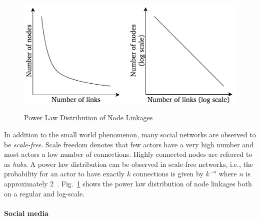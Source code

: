 \begin{figure}[h]
  \centering
  \includegraphics[height=6cm]{img/power_law_linkages}
  \caption[Power Law Distribution of Node Linkages]{Power Law Distribution of Node Linkages~\cite{Barabasi2003}}
\label{fig:power_law}
\end{figure}

In addition to the small world phenomenon, many social networks are observed to
be \textit{scale-free}.
Scale freedom denotes that few actors have a very high number and most actors 
a low number of connections.
Highly connected nodes are referred to as \textit{hubs}.
A power law distribution can be observed in scale-free networks, i.e., the
probability for an actor to have exactly $k$ connections is given by $k^{-n}$
where $n$ is approximately 2~\cite{Barabasi2003}.
Fig.~\ref{fig:power_law} shows the power law distribution of node linkages both
on a regular and log-scale.

\paragraph{Social media}
\label{sub:sn_social_media}

